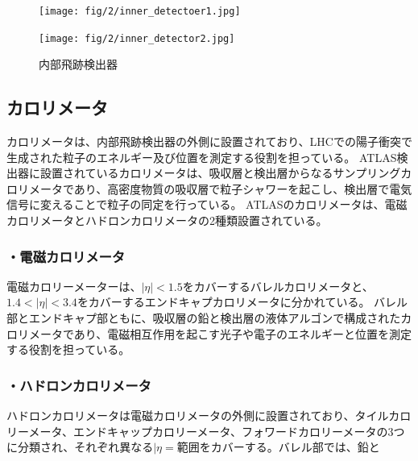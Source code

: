 \begin{figure}
    \centering
    \begin{minipage}[b]{0.4\linewidth}
        \centering
        \texttt{[image: fig/2/inner\_detectoer1.jpg]}
        \vspace{10pt}
        \label{fig:内部飛跡検出器の概略図1}
    \end{minipage}
    \hfill
    \begin{minipage}[b]{0.5\linewidth}
        \centering
        \texttt{[image: fig/2/inner\_detector2.jpg]}
        \vspace{10pt}
        \label{fig:内部飛跡検出器の概略図2}
    \end{minipage}
    \caption{内部飛跡検出器}
    \label{fig:内部飛跡検出器}
\end{figure}



\subsection{カロリメータ}
カロリメータは、内部飛跡検出器の外側に設置されており、LHCでの陽子衝突で生成された粒子のエネルギー及び位置を測定する役割を担っている。
ATLAS検出器に設置されているカロリメータは、吸収層と検出層からなるサンプリングカロリメータであり、高密度物質の吸収層で粒子シャワーを起こし、検出層で電気信号に変えることで粒子の同定を行っている。
ATLASのカロリメータは、電磁カロリメータとハドロンカロリメータの2種類設置されている。

\subsubsection{・電磁カロリメータ}
電磁カロリーメーターは、$|\eta|<1.5$をカバーするバレルカロリメータと、$1.4<|\eta|<3.4$をカバーするエンドキャプカロリメータに分かれている。
バレル部とエンドキャプ部ともに、吸収層の鉛と検出層の液体アルゴンで構成されたカロリメータであり、電磁相互作用を起こす光子や電子のエネルギーと位置を測定する役割を担っている。

\subsubsection{・ハドロンカロリメータ}
ハドロンカロリメータは電磁カロリメータの外側に設置されており、タイルカロリーメータ、エンドキャップカロリーメータ、フォワードカロリーメータの3つに分類され、それぞれ異なる$|\eta=$範囲をカバーする。バレル部では、鉛と

